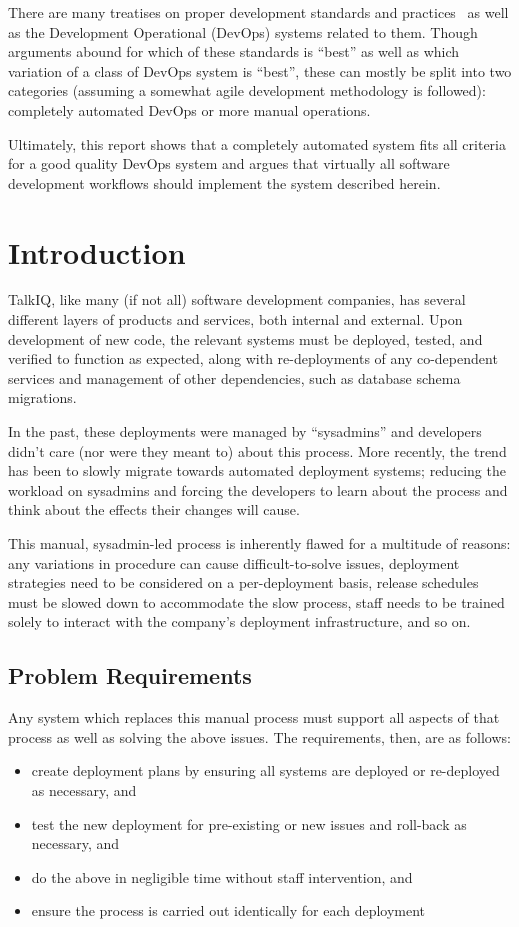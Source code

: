\documentclass[12pt]{article}
\begin{document}
There are many treatises on proper development standards and practices~\cite{practices} as well as the Development Operational (DevOps) systems related to them. Though arguments abound for which of these standards is ``best'' as well as which variation of a class of DevOps system is ``best'', these can mostly be split into two categories (assuming a somewhat agile development methodology is followed): completely automated DevOps or more manual operations.

Ultimately, this report shows that a completely automated system fits all criteria for a good quality DevOps system and argues that virtually all software development workflows should implement the system described herein.
\newpage


\toc
\lot


\section{Introduction}
TalkIQ, like many (if not all) software development companies, has several different layers of products and services, both internal and external. Upon development of new code, the relevant systems must be deployed, tested, and verified to function as expected, along with re-deployments of any co-dependent services and management of other dependencies, such as database schema migrations.

In the past, these deployments were managed by ``sysadmins'' and developers didn't care (nor were they meant to) about this process. More recently, the trend has been to slowly migrate towards automated deployment systems; reducing the workload on sysadmins and forcing the developers to learn about the process and think about the effects their changes will cause.

This manual, sysadmin-led process is inherently flawed for a multitude of reasons: any variations in procedure can cause difficult-to-solve issues, deployment strategies need to be considered on a per-deployment basis, release schedules must be slowed down to accommodate the slow process, staff needs to be trained solely to interact with the company's deployment infrastructure, and so on.

\subsection{Problem Requirements}
Any system which replaces this manual process must support all aspects of that process as well as solving the above issues. The requirements, then, are as follows:
\begin{itemize}
\item create deployment plans by ensuring all systems are deployed or re-deployed as necessary, and
\item test the new deployment for pre-existing or new issues and roll-back as necessary, and
\item do the above in negligible time without staff intervention, and
\item ensure the process is carried out identically for each deployment
\end{itemize}
\end{document}
